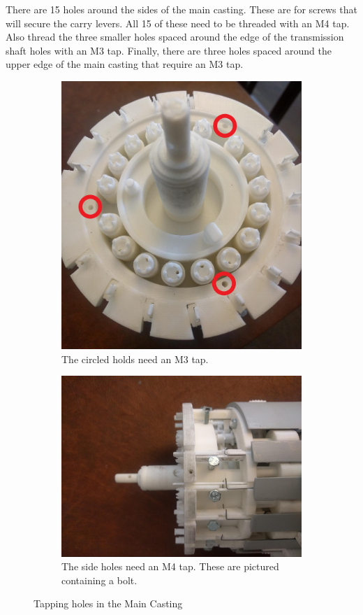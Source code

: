 \documentclass[openany]{book}
\begin{document}
There are 15 holes around the sides of the main casting. These are for screws that will secure the carry levers. All 15 of these need to be threaded with an M4 tap. Also thread the three smaller holes spaced around the edge of the transmission shaft holes with an M3 tap. Finally, there are three holes spaced around the upper edge of the main casting that require an M3 tap.

\begin{figure}[!ht]
	\centering
	\begin{subfigure}{.4\textwidth}
		\centering
		\includegraphics[width=.95\textwidth]{images/image45-circles.jpg}
		\caption{The circled holds need an M3 tap.}
		\label{fig:image45}	
	\end{subfigure}
	\begin{subfigure}{.4\textwidth}
		\centering
		\includegraphics[width=.95\textwidth]{images/image11.jpg}
		\caption{The side holes need an M4 tap. These are pictured containing a bolt.}
		\label{fig:image11}	
	\end{subfigure}
	\caption{Tapping holes in the Main Casting}
\end{figure}
\end{document}
